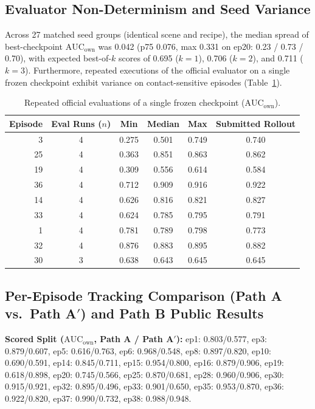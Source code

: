 \documentclass[10pt]{nvidiaextabstract}
\newcommand{\ownauc}{\ensuremath{\mathrm{AUC}_{\text{own}}}\xspace}
\begin{document}
\subsection{Evaluator Non-Determinism and Seed Variance}
Across 27 matched seed groups (identical scene and recipe), the median spread of best-checkpoint $\ownauc$ was 0.042 (p75 0.076, max 0.331 on ep20: 0.23 / 0.73 / 0.70), with expected best-of-$k$ scores of 0.695 ($k=1$), 0.706 ($k=2$), and 0.711 ($k=3$). Furthermore, repeated executions of the official evaluator on a single frozen checkpoint exhibit variance on contact-sensitive episodes (Table~\ref{tab:rescore}).

\begin{table}[h]
  \centering\small
  \begin{tabular}{@{}rccccc@{}}
    \toprule
    \textbf{Episode} & \textbf{Eval Runs ($n$)} & \textbf{Min} & \textbf{Median} & \textbf{Max} & \textbf{Submitted Rollout} \\
    \midrule
    3  & 4 & 0.275 & 0.501 & 0.749 & 0.740 \\
    25 & 4 & 0.363 & 0.851 & 0.863 & 0.862 \\
    19 & 4 & 0.309 & 0.556 & 0.614 & 0.584 \\
    36 & 4 & 0.712 & 0.909 & 0.916 & 0.922 \\
    14 & 4 & 0.626 & 0.816 & 0.821 & 0.827 \\
    33 & 4 & 0.624 & 0.785 & 0.795 & 0.791 \\
    1  & 4 & 0.781 & 0.789 & 0.798 & 0.773 \\
    32 & 4 & 0.876 & 0.883 & 0.895 & 0.882 \\
    30 & 3 & 0.638 & 0.643 & 0.645 & 0.645 \\
    \bottomrule
  \end{tabular}
  \caption{Repeated official evaluations of a single frozen checkpoint ($\ownauc$).}
  \label{tab:rescore}
\end{table}

\subsection{Per-Episode Tracking Comparison (Path A vs.\ Path A$'$) and Path B Public Results}
\textbf{Scored Split ($\ownauc$, Path A / Path A$'$):} ep1: 0.803/0.577, ep3: 0.879/0.607, ep5: 0.616/0.763, ep6: 0.968/0.548, ep8: 0.897/0.820, ep10: 0.690/0.591, ep14: 0.845/0.711, ep15: 0.954/0.800, ep16: 0.879/0.906, ep19: 0.618/0.898, ep20: 0.745/0.566, ep25: 0.870/0.681, ep28: 0.960/0.906, ep30: 0.915/0.921, ep32: 0.895/0.496, ep33: 0.901/0.650, ep35: 0.953/0.870, ep36: 0.922/0.820, ep37: 0.990/0.732, ep38: 0.988/0.948.
\end{document}
